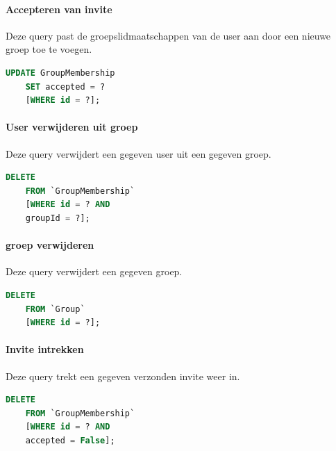 \documentclass[11pt]{article}
\begin{document}
\paragraph{Accepteren van invite}

  Deze query past de groepslidmaatschappen van de user aan door een nieuwe groep toe te voegen.

  \begin{framed}
  \begin{lstlisting}[language=sql]
    UPDATE GroupMembership
    SET accepted = ?
    [WHERE id = ?];
  \end{lstlisting}
  \end{framed}

\paragraph{User verwijderen uit groep}

  Deze query verwijdert een gegeven user uit een gegeven groep.

  \begin{framed}
  \begin{lstlisting}[language=sql]
    DELETE 
    FROM `GroupMembership` 
    [WHERE id = ? AND 
    groupId = ?];
  \end{lstlisting}
  \end{framed}
  
\paragraph{groep verwijderen}

  Deze query verwijdert een gegeven groep.

  \begin{framed}
  \begin{lstlisting}[language=sql]
    DELETE 
    FROM `Group` 
    [WHERE id = ?];
  \end{lstlisting}
  \end{framed}  
  
\paragraph{Invite intrekken}

  Deze query trekt een gegeven verzonden invite weer in.

  \begin{framed}
  \begin{lstlisting}[language=sql]
    DELETE 
    FROM `GroupMembership` 
    [WHERE id = ? AND 
    accepted = False];
  \end{lstlisting}
  \end{framed}
  
\end{document}
